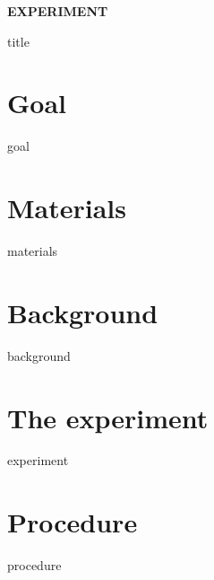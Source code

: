 \documentclass[cover.tex]{subfiles}
\begin{document}
 \begin{refsection}


\hfill\vspace{0.2cm}\begin{center}{\large \bfseries EXPERIMENT {\thesection}\par\Huge
 {title}
 \\[5pt] \par}\vspace{0.2cm}\end{center}\par\noindent
 
 
\section*{Goal}
 {goal}
\section*{Materials}
 {materials}
\section*{Background}
{background}
\section*{The experiment}
{experiment}


\printbibliography[heading=subbibliography]
\section*{Procedure}
{procedure}
   \clearpage\mbox{}\clearpage







\end{refsection}
\end{document}

